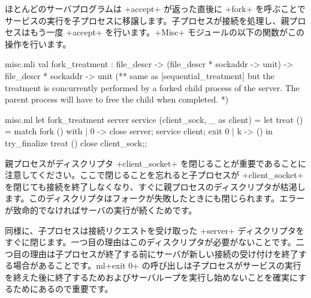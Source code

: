 ほとんどのサーバプログラムは \ml+accept+ が返った直後に \ml+fork+ を呼ぶことでサービスの実行を子プロセスに移譲します。子プロセスが接続を処理し、親プロセスはもう一度 \ml+accept+ を行います。\ml+Misc+ モジュールの以下の関数がこの操作を行います。
%
\begin{codefile}{misc.mli}
val fork_treatment :
 file_descr -> (file_descr * sockaddr -> unit) ->
 file_descr * sockaddr -> unit
(** same as [sequential_treatment] but the treatment is concurrently
 performed by a forked child process of the server. The parent process
 will have to free the child when completed. *)
\end{codefile}
%
\begin{listingcodefile}{misc.ml}
let fork_treatment server service (client_sock, _ as client) =
  let treat () = match fork () with
    | 0 -> close server; service client; exit 0
    | k -> ()
  in
  try_finalize treat () close client_sock;;
\end{listingcodefile}
%
親プロセスがディスクリプタ \ml+client_socket+ を閉じることが重要であることに注意してください。ここで閉じることを忘れると子プロセスが \ml+client_socket+ を閉じても接続を終了しなくなり、すぐに親プロセスのディスクリプタが枯渇します。このディスクリプタはフォークが失敗したときにも閉じられます。エラーが致命的でなければサーバの実行が続くためです。

同様に、子プロセスは接続リクエストを受け取った \ml+server+ ディスクリプタをすぐに閉じます。一つ目の理由はこのディスクリプタが必要がないことです。二つ目の理由は子プロセスが終了する前にサーバが新しい接続の受け付けを終了する場合があることです。ml+exit 0+ の呼び出しは子プロセスがサービスの実行を終えた後に終了するためおよびサーバループを実行し始めないことを確実にするためにあるので重要です。

